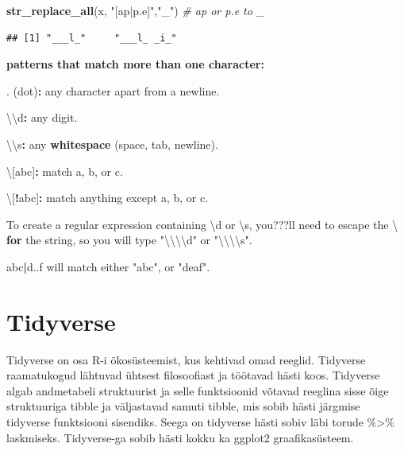\documentclass[]{book}
\newenvironment{Shaded}{\begin{snugshade}}{\end{snugshade}}
\newcommand{\KeywordTok}[1]{\textcolor[rgb]{0.13,0.29,0.53}{\textbf{#1}}}
\newcommand{\CharTok}[1]{\textcolor[rgb]{0.31,0.60,0.02}{#1}}
\newcommand{\StringTok}[1]{\textcolor[rgb]{0.31,0.60,0.02}{#1}}
\newcommand{\CommentTok}[1]{\textcolor[rgb]{0.56,0.35,0.01}{\textit{#1}}}
\newcommand{\ControlFlowTok}[1]{\textcolor[rgb]{0.13,0.29,0.53}{\textbf{#1}}}
\newcommand{\OperatorTok}[1]{\textcolor[rgb]{0.81,0.36,0.00}{\textbf{#1}}}
\newcommand{\NormalTok}[1]{#1}
\begin{document}
\begin{Shaded}
\begin{Highlighting}[]
\KeywordTok{str_replace_all}\NormalTok{(x, }\StringTok{"[ap|p.e]"}\NormalTok{,}\StringTok{"_"}\NormalTok{) }\CommentTok{# ap or p.e to _}
\end{Highlighting}
\end{Shaded}

\begin{verbatim}
## [1] "___l_"     "___l_ _i_"
\end{verbatim}

\textbf{patterns that match more than one character:}

\begin{Shaded}
\begin{Highlighting}[]
\NormalTok{. (dot)}\OperatorTok{:}\StringTok{ }\NormalTok{any character apart from a newline.}

\NormalTok{\textbackslash{}\textbackslash{}d}\OperatorTok{:}\StringTok{ }\NormalTok{any digit.}

\NormalTok{\textbackslash{}\textbackslash{}s}\OperatorTok{:}\StringTok{ }\NormalTok{any }\KeywordTok{whitespace}\NormalTok{ (space, tab, newline).}

\NormalTok{\textbackslash{}[abc]}\OperatorTok{:}\StringTok{ }\NormalTok{match a, b, or c.}

\NormalTok{\textbackslash{}[}\OperatorTok{!}\NormalTok{abc]}\OperatorTok{:}\StringTok{ }\NormalTok{match anything except a, b, or c.}

\NormalTok{To create a regular expression containing \textbackslash{}d or \textbackslash{}s, you???ll need to escape the \textbackslash{} }\ControlFlowTok{for}\NormalTok{ the string, so you will type }\StringTok{"}\CharTok{\textbackslash{}\textbackslash{}\textbackslash{}\textbackslash{}}\StringTok{d"}\NormalTok{ or }\StringTok{"}\CharTok{\textbackslash{}\textbackslash{}\textbackslash{}\textbackslash{}}\StringTok{s"}\NormalTok{.}

\NormalTok{abc}\OperatorTok{|}\NormalTok{d..f will match either }\StringTok{"abc"}\NormalTok{, or }\StringTok{"deaf"}\NormalTok{. }
\end{Highlighting}
\end{Shaded}

\chapter{Tidyverse}\label{tidyverse}

Tidyverse on osa R-i ökosüsteemist, kus kehtivad omad reeglid. Tidyverse
raamatukogud lähtuvad ühtsest filosoofiast ja töötavad hästi koos.
Tidyverse algab andmetabeli struktuurist ja selle funktsioonid võtavad
reeglina sisse õige struktuuriga tibble ja väljastavad samuti tibble,
mis sobib hästi järgmise tidyverse funktsiooni sisendiks. Seega on
tidyverse hästi sobiv läbi torude \%\textgreater{}\% laskmiseks.
Tidyverse-ga sobib hästi kokku ka ggplot2 graafikasüsteem.
\end{document}
